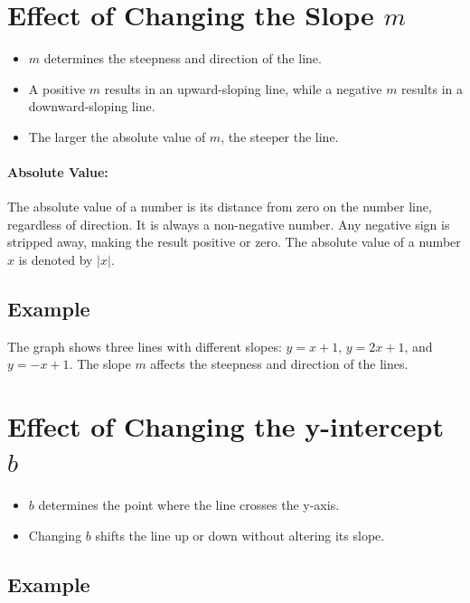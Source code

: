 \documentclass{article}
\begin{document}
\newpage

\section*{Effect of Changing the Slope \( m \)}

\begin{itemize}
    \item \( m \) determines the steepness and direction of the line.
    \item A positive \( m \) results in an upward-sloping line, while a negative \( m \) results in a downward-sloping line.
    \item The larger the absolute value of \( m \), the steeper the line.
\end{itemize}

\paragraph{Absolute Value:}
The absolute value of a number is its distance from zero on the number line, regardless of direction. It is always a non-negative number. Any negative sign is stripped away, making the result positive or zero. The absolute value of a number \(x\) is denoted by \(|x|\).\\

\subsection*{Example}



The graph shows three lines with different slopes: \( y = x + 1 \), \( y = 2x + 1 \), and \( y = -x + 1 \). The slope \( m \) affects the steepness and direction of the lines.

\newpage

\section*{Effect of Changing the y-intercept \( b \)}

\begin{itemize}
    \item \( b \) determines the point where the line crosses the y-axis.
    \item Changing \( b \) shifts the line up or down without altering its slope.
\end{itemize}

\subsection*{Example}
\end{document}
